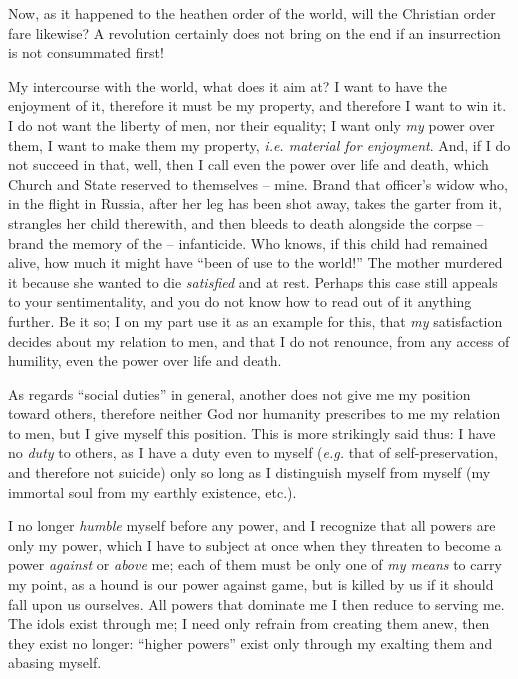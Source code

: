 Now, as it happened to the heathen order of the world, will the Christian 
order fare likewise? A revolution certainly does not bring on the end if an 
insurrection is not consummated first!

My intercourse with the world, what does it aim at? I want to have the 
enjoyment of it, therefore it must be my property, and therefore I want to win 
it. I do not want the liberty of men, nor their equality; I want only 
\textit{my} power over them, I want to make them my property, \textit{i.e. 
material for enjoyment}. And, if I do not succeed in that, well, then I call 
even the power over life and death, which Church and State reserved to 
themselves -- mine. Brand that officer's widow who, in the flight in Russia, 
after her leg has been shot away, takes the garter from it, strangles her 
child therewith, and then bleeds to death alongside the corpse -- brand the 
memory of the -- infanticide. Who knows, if this child had remained alive, how 
much it might have ``been of use to the world!'' The mother murdered it 
because she wanted to die \textit{satisfied} and at rest. Perhaps this case 
still appeals to your sentimentality, and you do not know how to read out of 
it anything further. Be it so; I on my part use it as an example for this, 
that \textit{my} satisfaction decides about my relation to men, and that I do 
not renounce, from any access of humility, even the power over life and death.

As regards ``social duties'' in general, another does not give me my 
position toward others, therefore neither God nor humanity prescribes to me my 
relation to men, but I give myself this position. This is more strikingly said 
thus: I have no \textit{duty} to others, as I have a duty even to myself 
(\textit{e.g.} that of self-preservation, and therefore not suicide) only so 
long as I distinguish myself from myself (my immortal soul from my earthly 
existence, etc.).

I no longer \textit{humble} myself before any power, and I recognize that all 
powers are only my power, which I have to subject at once when they threaten 
to become a power \textit{against} or \textit{above} me; each of them must be 
only one of \textit{my means} to carry my point, as a hound is our power 
against game, but is killed by us if it should fall upon us ourselves. All 
powers that dominate me I then reduce to serving me. The idols exist through 
me; I need only refrain from creating them anew, then they exist no longer: 
``higher powers'' exist only through my exalting them and abasing myself.

